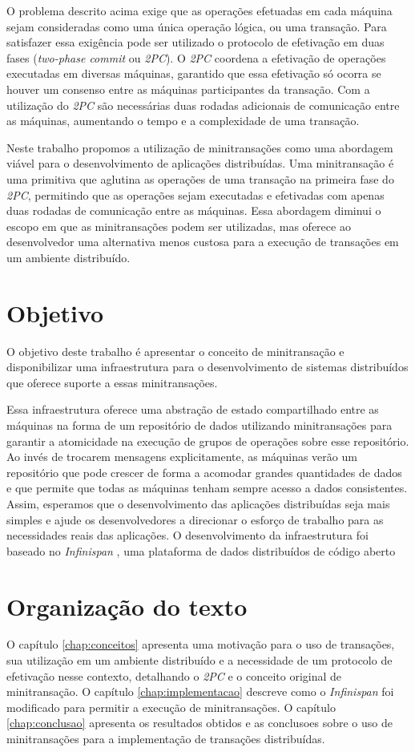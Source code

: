 \documentclass[11pt,twoside,a4paper]{book}
\begin{document}
O problema descrito acima exige que as operações efetuadas em cada máquina sejam consideradas como uma única operação lógica, ou uma transação. 
Para satisfazer essa exigência pode ser utilizado o protocolo de efetivação em duas fases (\emph{two-phase commit} ou \emph{2PC}). O \emph{2PC} 
coordena a efetivação de operações executadas em diversas máquinas, garantido que essa efetivação só ocorra se houver um consenso entre as 
máquinas participantes da transação. Com a utilização do \emph{2PC} são necessárias duas rodadas adicionais de comunicação entre as máquinas, 
aumentando o tempo e a complexidade de uma transação.

Neste trabalho propomos a utilização de minitransações como uma abordagem
viável para o desenvolvimento de aplicações distribuídas.
Uma minitransação é uma primitiva que aglutina as operações de uma transação na primeira fase do \emph{2PC}, permitindo que as operações sejam 
executadas e efetivadas com apenas duas rodadas de comunicação entre as máquinas. Essa abordagem diminui o escopo em que as minitransações podem 
ser utilizadas, mas oferece ao desenvolvedor uma alternativa menos custosa para a execução de transações em um ambiente distribuído.

\section{Objetivo}
\label{sec:objetivo}
O objetivo deste trabalho é apresentar o conceito de minitransação e
disponibilizar uma infraestrutura para o desenvolvimento de sistemas
distribuídos que oferece suporte a essas minitransações.

Essa infraestrutura oferece uma abstração de estado compartilhado entre as
máquinas na forma de um repositório de dados utilizando minitransações para garantir a atomicidade na execução de grupos de operações sobre esse repositório. 
Ao invés de trocarem mensagens explicitamente, as máquinas verão um repositório que pode crescer de forma a acomodar grandes 
quantidades de dados e que permite que todas as máquinas tenham sempre acesso a dados consistentes. Assim, esperamos que o 
desenvolvimento das aplicações distribuídas seja mais simples e ajude os
desenvolvedores a direcionar o esforço de trabalho para as necessidades reais
das aplicações. O desenvolvimento da infraestrutura foi baseado no
\emph{Infinispan} \cite{infinispan}, uma plataforma de dados distribuídos de código aberto

\section{Organização do texto}
\label{sec:organizacao_do_texto}
O capítulo \ref{chap:conceitos} apresenta uma motivação para o uso de
transações, sua utilização em um ambiente distribuído e a necessidade de um
protocolo de efetivação nesse contexto, detalhando o \emph{2PC} e o conceito
original de minitransação. O capítulo \ref{chap:implementacao} descreve como
o \emph{Infinispan} foi modificado para permitir a execução de minitransações.
O capítulo \ref{chap:conclusao} apresenta os resultados obtidos e as conclusoes
sobre o uso de minitransações para a implementação de transações distribuídas.
\end{document}
